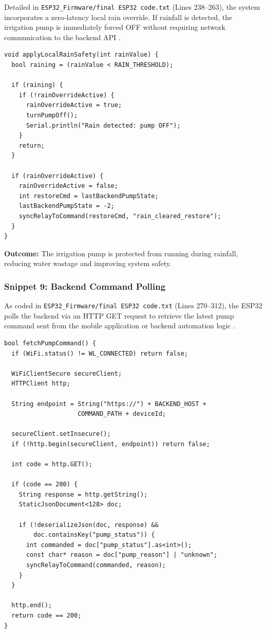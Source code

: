 Detailed in \texttt{ESP32\_Firmware/final ESP32 code.txt} (Lines 238--263), the system incorporates a zero-latency local rain override. If rainfall 
is detected, the irrigation pump is immediately forced OFF without requiring network 
communication to the backend API \cite{garcia2020iot}.

\begin{lstlisting}
void applyLocalRainSafety(int rainValue) {
  bool raining = (rainValue < RAIN_THRESHOLD);

  if (raining) {
    if (!rainOverrideActive) {
      rainOverrideActive = true;
      turnPumpOff();
      Serial.println("Rain detected: pump OFF");
    }
    return;
  }

  if (rainOverrideActive) {
    rainOverrideActive = false;
    int restoreCmd = lastBackendPumpState;
    lastBackendPumpState = -2;
    syncRelayToCommand(restoreCmd, "rain_cleared_restore");
  }
}
\end{lstlisting}

\textbf{Outcome:} The irrigation pump is protected from running 
during rainfall, reducing water wastage and improving system safety.

\subsubsection{Snippet 9: Backend Command Polling}
\label{subsec:snippet9}

As coded in \texttt{ESP32\_Firmware/final ESP32 code.txt} (Lines 270--312), the ESP32 polls the backend via an HTTP GET request to retrieve the latest pump command sent 
from the mobile application or backend automation logic \cite{yokotani2016mqtt}.

\begin{lstlisting}
bool fetchPumpCommand() {
  if (WiFi.status() != WL_CONNECTED) return false;

  WiFiClientSecure secureClient;
  HTTPClient http;

  String endpoint = String("https://") + BACKEND_HOST +
                    COMMAND_PATH + deviceId;

  secureClient.setInsecure();
  if (!http.begin(secureClient, endpoint)) return false;

  int code = http.GET();

  if (code == 200) {
    String response = http.getString();
    StaticJsonDocument<128> doc;

    if (!deserializeJson(doc, response) &&
        doc.containsKey("pump_status")) {
      int commanded = doc["pump_status"].as<int>();
      const char* reason = doc["pump_reason"] | "unknown";
      syncRelayToCommand(commanded, reason);
    }
  }

  http.end();
  return code == 200;
}
\end{lstlisting}

